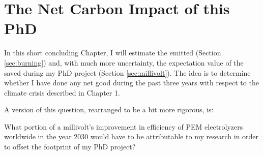 

\chapter{The Net Carbon Impact of this PhD}\label{ch:impact}

In this short concluding Chapter, I will estimate the  emitted (Section \ref{sec:burning}) and, with much more uncertainty, the expectation value of the  saved during my PhD project (Section \ref{sec:millivolt}). The idea is to determine whether I have done any net good during the past three years with respect to the climate crisis described in Chapter 1.

A version of this question, rearranged to be a bit more rigorous, is:
\begin{question}
	What portion of a millivolt's improvement in efficiency of PEM electrolyzers worldwide in the year 2030 would have to be attributable to my research in order to offset the  footprint of my PhD project? \label{q:impact}
\end{question}








